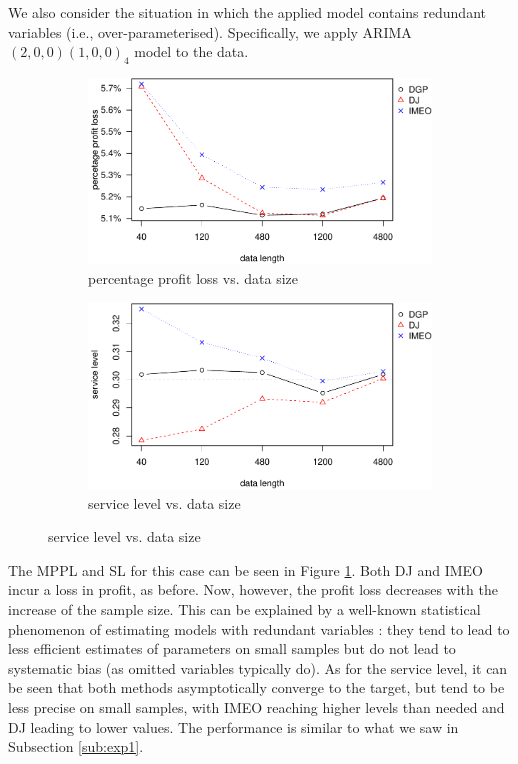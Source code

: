 \documentclass[a4paper,11pt]{article}
\begin{document}
We also consider the situation in which the applied model contains redundant variables (i.e., over-parameterised). Specifically, we apply ARIMA$(2,0,0)(1,0,0)_4$ model to the data.

\begin{figure}[ht]
\centering
\caption{Performance vs. sample size with over-paramaterised linear model}
\begin{subfigure}[b]{0.48\textwidth}
\centering
\includegraphics[width=\textwidth]{SAR(2)(1)_4ppl.pdf}
\caption{percentage profit loss vs. data size}
\end{subfigure}
\hfill
\begin{subfigure}[b]{0.48\textwidth}
\centering
\includegraphics[width=\textwidth]{SAR(2)(1)_4sl.pdf}
\caption{service level vs. data size}
\end{subfigure}
\label{fig:mis_over}
\end{figure}

The MPPL and SL for this case can be seen in Figure \ref{fig:mis_over}. Both DJ and IMEO incur a loss in profit, as before. Now, however, the profit loss decreases with the increase of the sample size. This can be explained by a well-known statistical phenomenon of estimating models with redundant variables \cite{FG67}: they tend to lead to less efficient estimates of parameters on small samples but do not lead to systematic bias (as omitted variables typically do). As for the service level, it can be seen that both methods asymptotically converge to the target, but tend to be less precise on small samples, with IMEO reaching higher levels than needed and DJ leading to lower values. The performance is similar to what we saw in Subsection \ref{sub:exp1}.
\end{document}
